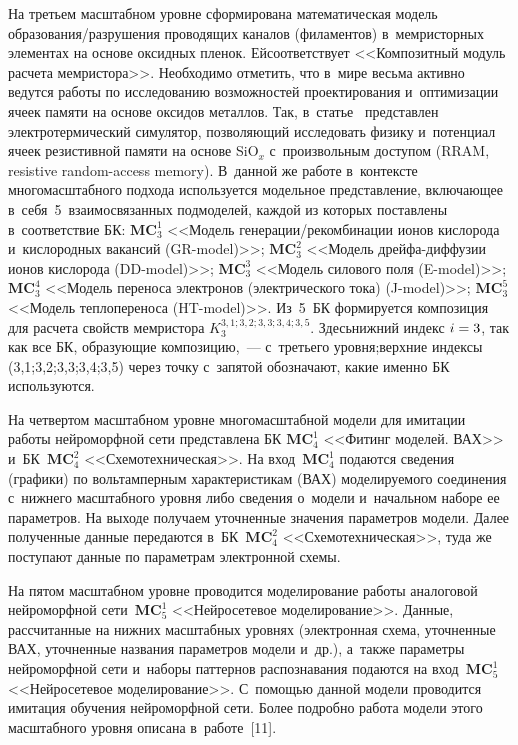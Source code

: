 \begin{multicols}{2}
На третьем масштабном уровне сформирована математическая модель 
обра\-зо\-ва\-ния/раз\-ру\-ше\-ния\linebreak
 проводящих каналов (филаментов) в~мемристорных 
элементах на основе оксидных пленок. Ей\linebreak соответствует <<Композитный модуль 
расчета мемристора>>. Необходимо отметить, что в~мире весьма активно ведутся 
работы по исследованию возможностей проектирования и~оптимизации ячеек 
памяти на основе оксидов металлов. Так, в~\mbox{статье}~\cite{10-ab} пред\-став\-лен 
электротермический симулятор, позволяющий исследовать физику и~потенциал 
ячеек резистивной памяти на основе SiO$_x$ с~произвольным доступом (RRAM,
resistive random-access memory). 
В~данной же работе в~контексте многомасштабного подхода используется 
модельное пред\-став\-ле\-ние, вклю\-ча\-ющее в~себя~5~взаимосвязанных 
подмоделей, каждой из которых по\-став\-ле\-ны в~соответствие БК: 
$\mathbf{MC}_3^1$ <<Модель  
ге\-не\-ра\-ции/ре\-ком\-би\-на\-ции ионов кислорода и~кис\-ло\-род\-ных вакансий  
(GR-model)>>; $\mathbf{MC}_3^2$ <<Модель дрей\-фа-диф\-фу\-зии ионов 
кислорода  
(DD-model)>>; $\mathbf{MC}_3^3$ <<Модель силового поля (E-model)>>; 
$\mathbf{MC}_3^4$ <<Модель переноса электронов (электрического тока) (J-model)>>;
$\mathbf{MC}_3^5$ <<Модель теплопереноса  
(HT-model)>>. Из~5~БК формируется композиция для расчета свойств 
мемристора $K_3^{3,1; 3,2; 3,3; 3,4; 3,5}$. Здесь\linebreak нижний индекс $i\hm=3$, так как 
все БК, об\-ра\-зующие композицию,~--- с~треть\-его уровня;\linebreak верхние индексы 
(3,1;3,2;3,3;3,4;3,5) через точку с~запятой обозначают, какие именно БК 
ис\-поль\-зу\-ются.
 
     
     На четвертом масштабном уровне многомасштабной модели для имитации работы 
нейроморфной сети представлена БК
$\mathbf{MC}_4^1$ <<Фитинг моделей. ВАХ>> 
и~БК~$\mathbf{MC}_4^2$ <<Схемотехническая>>. На 
вход~$\mathbf{MC}_4^1$ подаются сведения (графики) по вольтамперным 
характеристикам (ВАХ) моделируемого соединения с~нижнего масштабного 
уровня либо сведения о~модели и~начальном наборе ее па\-ра\-мет\-ров. На выходе 
получаем уточненные значения па\-ра\-мет\-ров модели. Далее полученные данные 
передаются в~БК~$\mathbf{MC}_4^2$ <<Схемотехническая>>, туда же 
по\-сту\-па\-ют данные по па\-ра\-мет\-рам электронной схемы.
     
     На пятом масштабном уровне проводится моделирование работы аналоговой 
нейроморфной сети~$\mathbf{MC}_5^1$ <<Нейросетевое моделирование>>. 
Данные, рассчитанные на нижних масштабных уровнях (электронная схема, 
уточненные ВАХ, уточненные названия параметров модели и~др.), а~также 
параметры нейроморфной сети и~наборы паттернов распознавания подаются на 
вход~$\mathbf{MC}_5^1$ <<Нейросетевое моделирование>>. С~помощью 
данной модели проводится имитация обучения нейроморфной сети. Более 
подробно работа модели этого масштабного уровня описана в~работе~[11].
    

\end{multicols}
